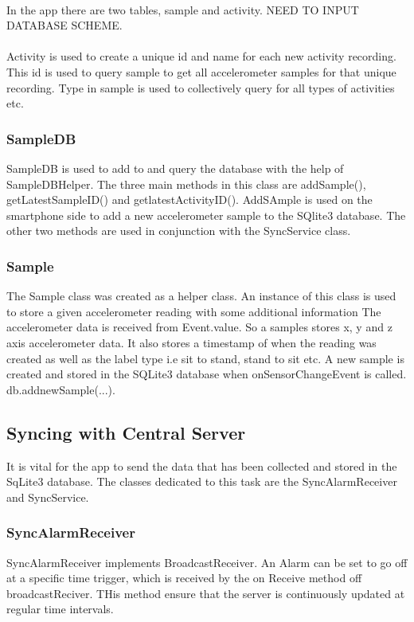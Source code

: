 \paragraph{}
In the app there are two tables, sample and activity. NEED TO INPUT DATABASE SCHEME.
\paragraph{}
Activity is used to create a unique id and name for each new activity recording. This id is used to query sample to get all accelerometer samples for that unique recording. Type in sample is used to collectively query for all types of activities etc.
\subsubsection{SampleDB} %
\label{ssub:db}
SampleDB is used to add to and query the database with the help of SampleDBHelper. The three main methods in this class are addSample(), getLatestSampleID() and getlatestActivityID(). AddSAmple is used on the smartphone side to add a new accelerometer sample to the SQlite3 database. The other two methods are used in conjunction with the SyncService class.
\subsubsection{Sample} %
\label{ssub:sample}
The Sample class was created as a helper class. An instance of this class is used to store a given accelerometer reading with some additional information The accelerometer data is received from Event.value. So a samples stores x, y and z axis accelerometer data. It also stores a timestamp of when the reading was created as well as the label type i.e sit to stand, stand to sit etc. A new sample is created and stored in the SQLite3 database when onSensorChangeEvent is called. db.addnewSample(...).

\subsection{Syncing with Central Server} %
\label{sub:synching}
It is vital for the app to send the data that has been collected and stored in the SqLite3 database. The classes dedicated to this task are the SyncAlarmReceiver and SyncService.
\subsubsection{SyncAlarmReceiver} %
\label{ssub:alarm}
SyncAlarmReceiver implements BroadcastReceiver. An Alarm can be set to go off at a specific time trigger, which is received by the on Receive method off broadcastReciver. THis method ensure that the server is continuously updated at regular time intervals.
